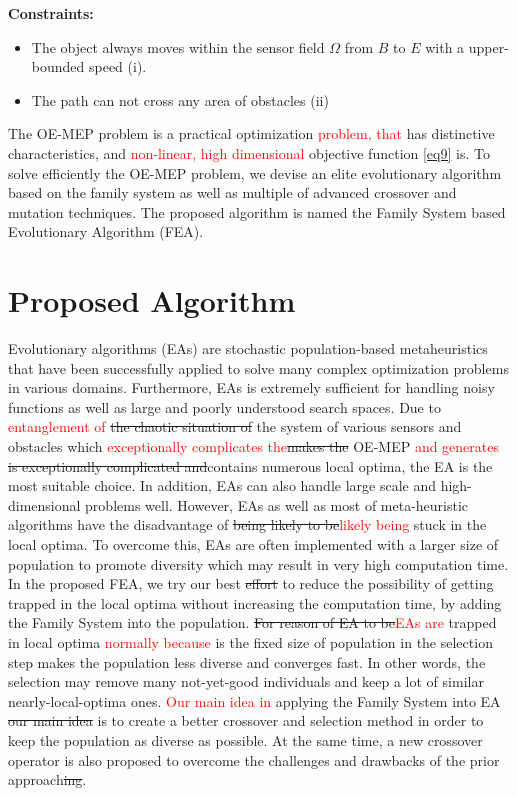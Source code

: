 \documentclass[final]{elsarticle}
\begin{document}
\textbf{Constraints:}	
\begin{itemize}
	\item The object always moves within the sensor field $\Omega $ from $B$ to $E$ with a upper-bounded speed (i).
	\item The path can not cross any area of obstacles  (ii)
\end{itemize}
	
The OE-MEP problem is a practical optimization \textcolor{red}{problem, that} has distinctive characteristics, and \textcolor{red}{non-linear, high dimensional} objective function \eqref{eq9} is. To solve efficiently the OE-MEP problem, we devise an elite evolutionary algorithm based on the family system as well as multiple of advanced crossover and mutation techniques. The proposed algorithm is named the Family System based Evolutionary Algorithm (FEA).

\section{Proposed Algorithm}
Evolutionary algorithms (EAs) are stochastic population-based metaheuristics that have been successfully applied to solve many complex optimization problems in various domains. Furthermore, EAs is extremely sufficient for handling noisy functions as well as large and poorly understood search spaces. Due to \textcolor{red}{entanglement of }\sout{the chaotic situation of} the system of various sensors and obstacles which \textcolor{red}{exceptionally complicates the}\sout{makes the} OE-MEP \textcolor{red}{and generates} \sout{is exceptionally complicated and}contains numerous local optima, the EA is the most suitable choice. In addition, EAs can also handle large scale and high-dimensional problems well. However, EAs as well as most of meta-heuristic algorithms have the disadvantage of \sout{being likely to be}\textcolor{red}{likely being} stuck in the local optima. To overcome this, EAs are often implemented with a larger size of population to promote diversity which may result in very high computation time. In the proposed FEA, we try our best \sout{effort} to reduce the possibility of getting trapped in the local optima without increasing the computation time, by adding the Family System into the population. \sout{For reason of EA to be}\textcolor{red}{EAs are} trapped in local optima \textcolor{red}{normally because} is the fixed size of population in the selection step makes the population less diverse and converges fast. In other words, the selection may remove many not-yet-good individuals and keep a lot of similar nearly-local-optima ones. \textcolor{red}{Our main idea in} applying the Family System into EA \sout{our main idea} is to create a better crossover and selection method in order to keep the population as diverse as possible. At the same time, a new crossover operator is also proposed to overcome the challenges and drawbacks of the prior approach\sout{ing}.
\end{document}
